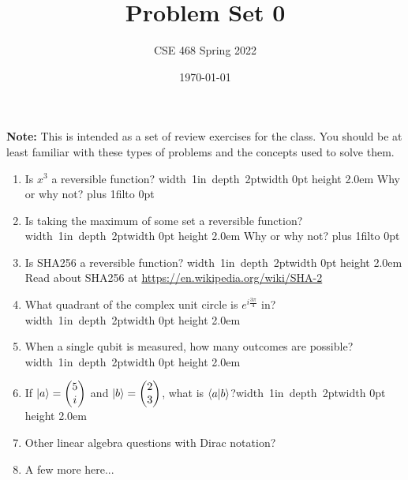 \documentclass[12pt]{article}
\title{Problem Set 0}
\author{CSE 468 Spring 2022}
\date{\today}
\newcommand{\Blank}{\mbox{\hskip 4pt\vrule width 1in depth 2pt}\vrule width 0pt height 2.0em}
\def\DefaultSpace{1in}
\newcommand{\LeaveSpace}[1][\DefaultSpace]{%
\vskip #1 plus 1fil\relax\hbox to 0pt{\hss} %
}
\begin{document}
\maketitle

\noindent \textbf{Note:} This is intended as a set of review exercises for the class. You should be at least familiar with these types of problems and the concepts used to solve them.

\begin{enumerate}[font=\bfseries]
    \item Is $x^3$ a reversible function? \Blank{} Why or why not? \LeaveSpace[0.5in]
    \item Is taking the maximum of some set a reversible function? \Blank{} Why or why not?\LeaveSpace{}
    \item Is SHA256 a reversible function? \Blank{} Read about SHA256 at \href{https://en.wikipedia.org/wiki/SHA-2}{https://en.wikipedia.org/wiki/SHA-2} 
    \item What quadrant of the complex unit circle is $e^{i\frac{3\pi}{4}}$ in?\Blank{}
    \item When a single qubit is measured, how many outcomes are possible?\Blank{}
    \item If $\ket{a} = \begin{pmatrix}5 \\ i \end{pmatrix}$ and $\ket{b} = \begin{pmatrix}2 \\ 3 \end{pmatrix}$, what is $\braket{a|b}$?\Blank{}
    \item Other linear algebra questions with Dirac notation?
    \item A few more here...
    
\end{enumerate}
\end{document}
